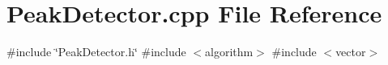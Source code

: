 \section{Peak\+Detector.\+cpp File Reference}
\label{_peak_detector_8cpp}
{\ttfamily \#include \char`\"{}Peak\+Detector.\+h\char`\"{}}\newline
{\ttfamily \#include $<$algorithm$>$}\newline
{\ttfamily \#include $<$vector$>$}\newline
